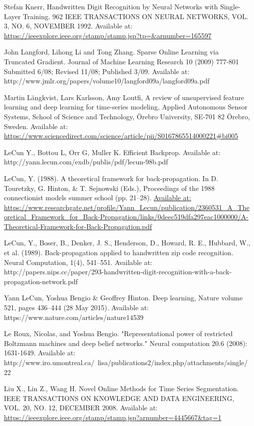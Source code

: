 \documentclass[a4paper,11pt,oneside]{article}
\theoremstyle{plain}
\theoremstyle{definition}
\begin{document}
\begin{thebibliography}{bibliography}
Stefan Knerr, Handwritten Digit Recognition by Neural Networks with Single-Layer 
Training. 962 IEEE TRANSACTIONS ON NEURAL NETWORKS, VOL. 3, NO. 6, NOVEMBER 
1992. Available at: \url{https://ieeexplore.ieee.org/stamp/stamp.jsp?tp=&arnumber=165597 }


John Langford, Lihong Li and Tong Zhang. Sparse Online Learning via Truncated 
Gradient. Journal of Machine Learning Research 10 (2009) 777-801 Submitted 6/08; Revised 11/08; Published 
3/09. Available at: http://www.jmlr.org/papers/volume10/langford09a/langford09a.pdf 

Martin Längkvist, Lars Karlsson,  Amy Loutfi, A review of unsupervised feature learning and deep learning for time-series 
modeling, Applied Autonomous Sensor Systems, School of Science and Technology, Örebro University, SE-701 82 Örebro, 
Sweden. Available at: \url{https://www.sciencedirect.com/science/article/pii/S0167865514000221#bi005}

LeCun Y., Bottou L, Orr G, Muller K. Efficient Backprop. Available at: http://yann.lecun.com/exdb/publis/pdf/lecun-98b.pdf

LeCun, Y. (1988). A theoretical framework for back-propagation. In D. Touretzky,
G. Hinton, \& T. Sejnowski (Eds.), Proceedings of the 1988 connectionist models summer school (pp. 21–28).
\url{Available at: https://www.researchgate.net/profile/Yann_Lecun/publication/2360531_A_Theoretical_Framework_for_Back-Propagation/links/0deec519dfa297eac1000000/A-Theoretical-Framework-for-Back-Propagation.pdf}

LeCun, Y., Boser, B., Denker, J. S., Henderson, D., Howard, R. E., Hubbard, W., et al.
(1989). Back-propagation applied to handwritten zip code recognition. Neural
Computation, 1(4), 541–551. Available at: http://papers.nips.cc/paper/293-handwritten-digit-recognition-with-a-back-propagation-network.pdf

Yann LeCun, Yoshua Bengio \& Geoffrey Hinton. Deep learning, Nature volume 521, pages 436–444 (28 May 
2015). Available at: https://www.nature.com/articles/nature14539

Le Roux, Nicolas, and Yoshua Bengio. "Representational power of restricted Boltzmann machines and deep belief networks." Neural computation 20.6 (2008): 1631-1649.
Available at: http://www.iro.umontreal.ca/~lisa/publications2/index.php/attachments/single/22

Liu X., Lin Z., Wang H. Novel Online Methods for Time Series Segmentation.  IEEE TRANSACTIONS ON KNOWLEDGE AND DATA ENGINEERING, VOL. 20, NO. 12, DECEMBER 
2008. Available at: \url{https://ieeexplore.ieee.org/stamp/stamp.jsp?arnumber=4445667&tag=1}


\end{thebibliography}
\end{document}
